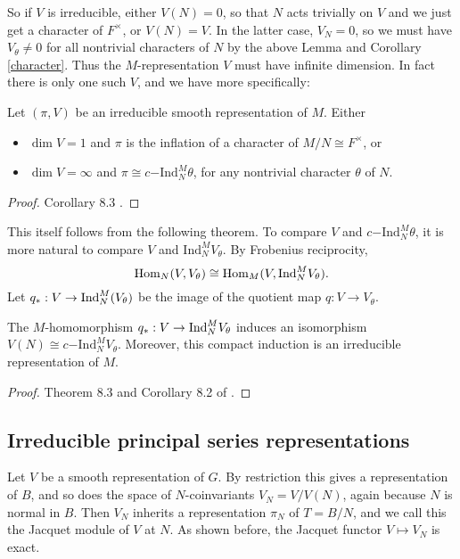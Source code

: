 So if $V$ is irreducible, either $V(N)=0$, so that $N$ acts trivially on $V$ and we just get a character of $F^\times$, or $V(N)=V$. In the latter case, $V_N=0$, so we must have $V_\theta \neq 0$ for all nontrivial characters of $N$ by the above Lemma and Corollary \ref{character}. Thus the $M$-representation $V$ must have infinite dimension. In fact there is only one such $V$, and we have more specifically:

\begin{thm}\label{inf dim}
    Let $(\pi,V)$ be an irreducible smooth representation of $M$. Either 
    \begin{itemize}
        \item $\dim V=1$ and $\pi$ is the inflation of a character of $M/N \cong F^\times$, or
        \item $\dim V = \infty$ and $\pi \cong c\mathrm{-Ind}_N^M \theta$, for any nontrivial character $\theta$ of $N$.
    \end{itemize}
\end{thm}
\begin{proof}
    Corollary 8.3 \cite{BH1}.
\end{proof}

This itself follows from the following theorem. To compare $V$ and $c\mathrm{-Ind}_N^M \theta$, it is more natural to compare $V$ and $\mathrm{Ind}_N^M V_\theta$. By Frobenius reciprocity,
$$\mathrm{Hom}_N(V,V_\theta) \cong \mathrm{Hom}_M(V,\mathrm{Ind}_N^M V_\theta).$$
Let $q_*: V \to \mathrm{Ind}_N^M(V_\theta)$ be the image of the quotient map $q: V \to V_\theta$.

\begin{thm}\label{mirabolic}
    The $M$-homomorphism $q_*: V \to \mathrm{Ind}_N^M V_\theta$ induces an isomorphism $V(N) \cong c\mathrm{-Ind}_N^M V_\theta$. Moreover, this compact induction is an irreducible representation of $M$.
\end{thm}
\begin{proof}
    Theorem 8.3 and Corollary 8.2 of \cite{BH1}.
\end{proof}



\subsection{Irreducible principal series representations}

Let $V$ be a smooth representation of $G$. By restriction this gives a representation of $B$, and so does the space of $N$-coinvariants $V_N=V/V(N)$, again because $N$ is normal in $B$. Then $V_N$ inherits a representation $\pi_N$ of $T=B/N$, and we call this the Jacquet module of $V$ at $N$. As shown before, the Jacquet functor $V \mapsto V_N$ is exact.

